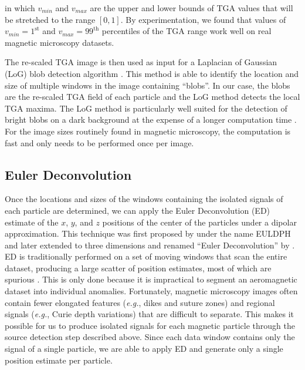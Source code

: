 \noindent
in which $v_{min}$ and $v_{max}$ are the upper and lower bounds of TGA values
that will be stretched to the range $[0, 1]$. By experimentation, we found
that values of $v_{min} = 1^\text{st}$ and $v_{max} = 99^\text{th}$
percentiles of the TGA range work well on real magnetic microscopy datasets.

The re-scaled TGA image is then used as input for a Laplacian of Gaussian (LoG)
blob detection algorithm \citep{Kong2013}. This method is able to identify the
location and size of multiple windows in the image containing ``blobs''. In our
case, the blobs are the re-scaled TGA field of each particle and the LoG method
detects the local TGA maxima. The LoG method is particularly well suited for
the detection of bright blobs on a dark background at the expense of a longer
computation time \citep{Han2016}. For the image sizes routinely found in
magnetic microscopy, the computation is fast and only needs to be performed
once per image.

\subsection{Euler Deconvolution}

Once the locations and sizes of the windows containing the isolated signals of
each particle are determined, we can apply the Euler Deconvolution (ED)
estimate of the $x$, $y$, and $z$ positions of the center of the particles
under a dipolar approximation. This technique was first proposed by
\citet{Thompson1982} under the name EULDPH and later extended to three
dimensions and renamed ``Euler Deconvolution'' by \citet{Reid1990}. ED is
traditionally performed on a set of moving windows that scan the entire
dataset, producing a large scatter of position estimates, most of which are
spurious \citep{Silva20033D}. This is only done because it is impractical to
segment an aeromagnetic dataset into individual anomalies. Fortunately,
magnetic microscopy images often contain fewer elongated features (\textit{e.g.}, dikes and
suture zones) and regional signals (\textit{e.g.}, Curie depth variations) that are
difficult to separate. This makes it possible for us to produce isolated
signals for each magnetic particle through the source detection step described
above. Since each data window contains only the signal of a single particle, we
are able to apply ED and generate only a single position estimate per particle.


